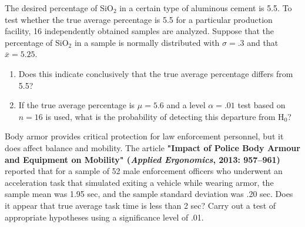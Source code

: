 \documentclass[11pt,letterpaper,boxed]{hmcpset}
\begin{document}
{%

\begin{problem}[8.2.21ab]
	 The desired percentage of SiO$_2$ in a certain type of aluminous cement is 5.5. To test whether the true average percentage is 5.5 for a particular production facility, 16 independently obtained samples are analyzed. Suppose that the percentage of SiO$_2$ in a sample is normally distributed with $\sigma = .3$ and that $\overline{x} = 5.25$.\\
	\begin{enumerate}
		\item
			Does this indicate conclusively that the true average percentage differs from 5.5?
		\item
			If the true average percentage is $\mu = 5.6$ and a level $\alpha = .01$ test based on $n = 16$ is used, what is the probability of detecting this departure from H$_0$?
	\end{enumerate}
\end{problem}
\begin{solution}
	\vfill
\end{solution}
\newpage


\begin{problem}[8.2.25]
	 Body armor provides critical protection for law enforcement personnel, but it does affect balance and mobility. The article \textbf{"Impact of Police Body Armour and Equipment on Mobility" (\emph{Applied Ergonomics}, 2013: 957--961)} reported that for a sample of 52 male enforcement officers who underwent an acceleration task that simulated exiting a vehicle while wearing armor, the sample mean was 1.95 sec, and the sample standard deviation was .20 sec. Does it appear that true average task time is less than 2 sec? Carry out a test of appropriate hypotheses using a significance level of .01.
\end{problem}
\begin{solution}
	\vfill
\end{solution}
\newpage


}
\end{document}
